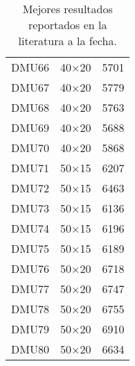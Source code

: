 \begin{table}[H]
\begin{tabular}{@{}ccc@{}}
DMU66 & 40$\times$20 & 5701\\ 
DMU67 & 40$\times$20 & 5779\\ 
DMU68 & 40$\times$20 & 5763\\ 
DMU69 & 40$\times$20 & 5688\\ 
DMU70 & 40$\times$20 & 5868\\ 
DMU71 & 50$\times$15 & 6207\\ 
DMU72 & 50$\times$15 & 6463\\ 
DMU73 & 50$\times$15 & 6136\\ 
DMU74 & 50$\times$15 & 6196\\ 
DMU75 & 50$\times$15 & 6189\\ 
DMU76 & 50$\times$20 & 6718\\ 
DMU77 & 50$\times$20 & 6747\\ 
DMU78 & 50$\times$20 & 6755\\ 
DMU79 & 50$\times$20 & 6910\\ 
DMU80 & 50$\times$20 & 6634\\ \bottomrule
\end{tabular}
\caption{Mejores resultados reportados en la literatura a la fecha.}
\label{tab:sota}
\end{table}

